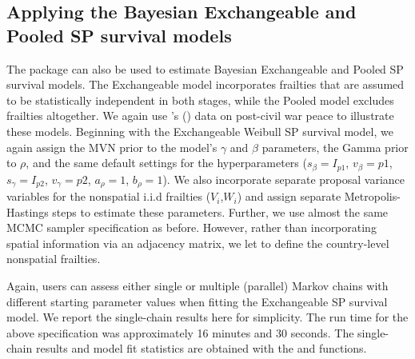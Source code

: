 \subsection{Applying the Bayesian Exchangeable and Pooled SP survival models}

The  package can also be used to estimate Bayesian Exchangeable and Pooled SP survival models. The Exchangeable model incorporates frailties that are assumed to be statistically independent in both stages, while the Pooled model excludes frailties altogether. We again use \citeauthor{walter2015bad}'s (\citeyear{walter2015bad}) data on post-civil war peace to illustrate these models. Beginning with the Exchangeable Weibull SP survival model, we again assign the MVN prior to the model’s $\gamma$ and $\beta$ parameters, the Gamma prior to $\rho$, and the same default settings for the hyperparameters ($s_\beta = I_{p1}$, $v_\beta=p1$, $s_\gamma = I_{p2}$, $v_\gamma=p2$,   $a_\rho = 1$, $b_\rho = 1$). We also incorporate separate proposal variance variables for the nonspatial i.i.d frailties ($V_i$,$W_i$) and assign separate Metropolis-Hastings steps to estimate these parameters. Further, we use almost the same MCMC sampler specification as before. However, rather than incorporating spatial information via an adjacency matrix, we let  to define the country-level nonspatial frailties.


\noindent Again, users can assess either single or multiple (parallel) Markov chains with different starting parameter values when fitting the Exchangeable SP survival model. We report the single-chain results here for simplicity. The run time for the above specification was approximately 16 minutes and 30 seconds. The single-chain results and model fit statistics are obtained with the  and  functions.

